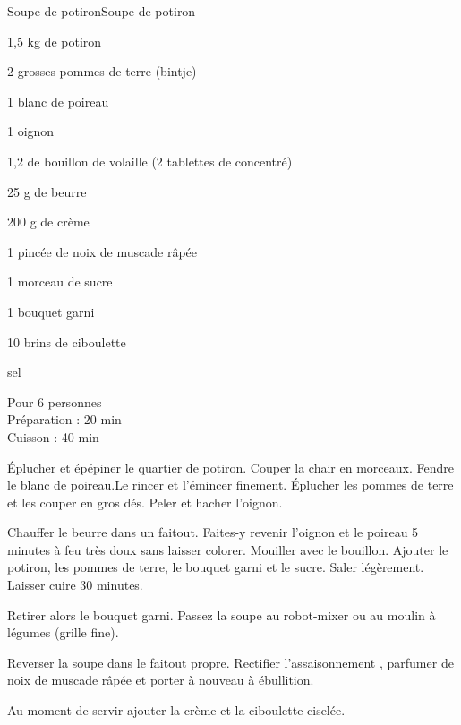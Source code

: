 \begin{recette}{Soupe de potiron}{Soupe de potiron}

\begin{ingredients}
1,5 kg de potiron\par
2 grosses pommes de terre (bintje)\par
1 blanc de poireau\par
1 oignon\par
1,2 de bouillon de volaille (2 tablettes de concentré)\par
25 g de beurre\par
200 g de crème\par
1 pincée de noix de muscade râpée\par
1 morceau de sucre\par
1 bouquet garni\par
10 brins de ciboulette\par
sel\par
\end{ingredients}

\begin{infos}
Pour 6 personnes\\
Préparation : 20 min\\
Cuisson : 40 min\\
\end{infos}

\begin{etapes}
\item Éplucher et épépiner le quartier de potiron. Couper la chair en morceaux. Fendre le blanc de poireau.Le rincer et l'émincer finement. Éplucher les pommes de terre et les couper en gros dés. Peler et hacher l’oignon.
\item Chauffer le beurre dans un faitout. Faites-y revenir l’oignon et le poireau 5 minutes à feu très doux sans laisser colorer. Mouiller avec le bouillon. Ajouter le potiron, les pommes de terre, le bouquet garni et le sucre. Saler légèrement. Laisser cuire 30 minutes.
\item Retirer  alors le bouquet garni. Passez la soupe au robot-mixer ou au moulin à légumes (grille fine).
\item Reverser la soupe dans le faitout propre. Rectifier l’assaisonnement , parfumer de noix de muscade râpée et porter à nouveau à ébullition.
\item Au moment de servir ajouter la crème et la ciboulette ciselée.
\end{etapes}

\end{recette}